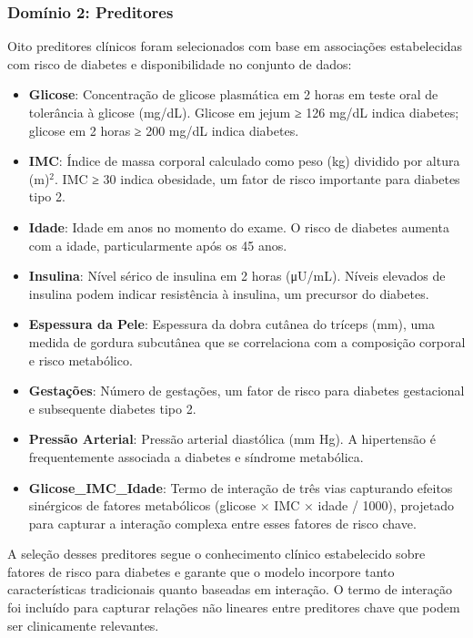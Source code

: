 \subsubsection{Domínio 2: Preditores}

Oito preditores clínicos foram selecionados com base em associações 
estabelecidas com risco de diabetes e disponibilidade no conjunto de dados:

\begin{itemize}[leftmargin=*]
    \item \textbf{Glicose}: Concentração de glicose plasmática em 2 horas 
          em teste oral de tolerância à glicose (mg/dL). Glicose em jejum 
          ≥ 126 mg/dL indica diabetes; glicose em 2 horas ≥ 200 mg/dL 
          indica diabetes.
    \item \textbf{IMC}: Índice de massa corporal calculado como peso (kg) 
          dividido por altura (m)$^2$. IMC ≥ 30 indica obesidade, um 
          fator de risco importante para diabetes tipo 2.
    \item \textbf{Idade}: Idade em anos no momento do exame. O risco de 
          diabetes aumenta com a idade, particularmente após os 45 anos.
    \item \textbf{Insulina}: Nível sérico de insulina em 2 horas (μU/mL). 
          Níveis elevados de insulina podem indicar resistência à insulina, 
          um precursor do diabetes.
    \item \textbf{Espessura da Pele}: Espessura da dobra cutânea do tríceps 
          (mm), uma medida de gordura subcutânea que se correlaciona com a 
          composição corporal e risco metabólico.
    \item \textbf{Gestações}: Número de gestações, um fator de risco para 
          diabetes gestacional e subsequente diabetes tipo 2.
    \item \textbf{Pressão Arterial}: Pressão arterial diastólica (mm Hg). 
          A hipertensão é frequentemente associada a diabetes e síndrome 
          metabólica.
    \item \textbf{Glicose\_IMC\_Idade}: Termo de interação de três vias 
          capturando efeitos sinérgicos de fatores metabólicos (glicose × 
          IMC × idade / 1000), projetado para capturar a interação complexa 
          entre esses fatores de risco chave.
\end{itemize}

A seleção desses preditores segue o conhecimento clínico estabelecido sobre 
fatores de risco para diabetes e garante que o modelo incorpore tanto 
características tradicionais quanto baseadas em interação. O termo de 
interação foi incluído para capturar relações não lineares entre preditores 
chave que podem ser clinicamente relevantes.

